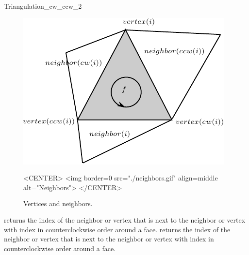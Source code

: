 \begin{ccRefClass}{Triangulation_cw_ccw_2}
 \begin{figure}
\begin{ccTexOnly}
    \begin{center}
     \includegraphics{Triangulation_2/neighbors}
    \end{center}
\end{ccTexOnly} 
    \caption{Vertices and neighbors.
    \label{Triangulation_ref_Fig_neighbors_bis}}
  \begin{ccHtmlOnly}
<CENTER>
<img border=0 src="./neighbors.gif" align=middle alt="Neighbors">
</CENTER>
\end{ccHtmlOnly} 
\end{figure}




\ccCreation
{}  %


\ccOperations
{}
{returns the index of the  neighbor or vertex that is  next to 
the neighbor or vertex with index 
in counterclockwise order around a face.}
\ccGlue
{}
{returns the index of the  neighbor or vertex that is  next to 
the neighbor or vertex with index 
in counterclockwise order around a face.}

\ccSeeAlso
{} \\
 \\

\end{ccRefClass}


